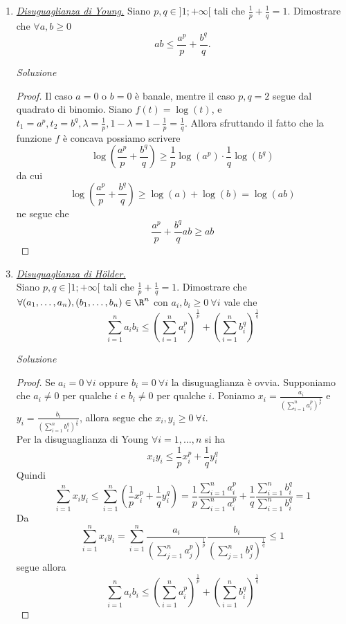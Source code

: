 \documentclass{article}
\begin{document}
\begin{enumerate}[label=\textbf{Esercizio 12.\arabic*.},itemindent=*]
\begin{proof}
    \[(x - y)\frac{f(y +\lambda(x - y))- f(y)}{\lambda(x - y)} \leq f(x) - f(y)\]
    Passando al limite per $\lambda\to 0^+$, dalla derivabilità di $f$ segue 
    \[(x - y)f'(y)\leq f(x) - f(y)\]
    ossia 
    \[f(x)\geq f(y) + f'(y)(x - y).\]
    Per l'arbitrarietà di $x,y\in \R$, la dimostrazione è conclusa.
\end{proof}
\item \underline{\textit{Disuguaglianza di Young.}} Siano $p, q\in ]1;+\infty[$ tali che $\frac{1}{p}+\frac{1}{q}=1$. Dimostrare che $\forall a,b\geq 0$ 
\[ab\leq \frac{a^p}{p}+\frac{b^q}{q}.\]
\item[\textit{\large Soluzione~}]~
\begin{proof}
    Il caso $a=0$ o $b=0$ è banale, mentre il caso $p,q=2$ segue dal quadrato di binomio. Siano $f(t)=\log(t)$, e $t_1=a^p, t_2=b^q, \lambda =\frac{1}{p}, 1-\lambda=1-\frac{1}{p}=\frac{1}{q}$.
    Allora sfruttando il fatto che la funzione $f$ è concava possiamo scrivere
    \[\log\left( \frac{a^p}{p}+\frac{b^q}{q} \right)\geq \frac{1}{p}\log(a^p)\cdot\frac{1}{q}\log(b^q)\]
    da cui
    \[\log\left( \frac{a^p}{p}+\frac{b^q}{q} \right)\geq \log(a)+\log(b)=\log(ab)\]
    ne segue che 
    \[\frac{a^p}{p}+\frac{b^q}{q}ab\geq ab\]
\end{proof}
\item \underline{\textit{Disuguaglianza di Hölder.}} \\Siano $p, q\in ]1;+\infty[$ tali che $\frac{1}{p}+\frac{1}{q}=1$. Dimostrare che $\forall (a_1, \dots, a_n), (b_1,\dots, b_n)\in \R^n$ con $a_i, b_i\geq 0~\forall i$ vale che 
\[\sum_{i=1}^n a_ib_i\leq \left(\sum_{i=1}^na_i^p\right)^{\frac{1}{p}}+\left(\sum_{i=1}^nb_i^q\right)^{\frac{1}{q}}\]
\item[\textit{\large Soluzione~}]~
\begin{proof}
   Se $a_i=0~\forall i$ oppure $b_i=0~\forall i$ la disuguaglianza è ovvia. Supponiamo che $a_i\neq 0$ per qualche $i$ e $b_i\neq 0$ per qualche $i$. Poniamo $x_i=\frac{a_i}{\left(\sum\limits_{i=1}^na_i^p\right)^{\frac{1}{p}}}$ e $y_i=\frac{b_i}{\left(\sum\limits_{i=1}^nb_i^q\right)^{\frac{1}{q}}}$, allora segue che $x_i,y_i\geq 0~\forall i$.
   \\Per la disuguaglianza di Young $\forall i=1, \dots, n$ si ha
   \[x_iy_i\leq \frac{1}{p}x_i^p+\frac{1}{q}y_i^q\]
   Quindi 
   \[\sum\limits_{i=1}^nx_iy_i\leq\sum\limits_{i=1}^n\left( \frac{1}{p}x_i^p+\frac{1}{q}y_i^q\right)=\frac{1}{p}\frac{\sum\limits_{i=1}^na_i^p}{\sum\limits_{i=1}^na_i^p}+\frac{1}{q}\frac{\sum\limits_{i=1}^nb_i^q}{\sum\limits_{i=1}^nb_i^q}=1\]
   Da
   \[\sum_{i = 1}^nx_iy_i =\sum_{i = 1}^n\frac{a_i}{(\sum_{j = 1}^n a_j^p)^{\frac{1}{p}}}\frac{b_i}{(\sum_{j = 1}^n b_j^q)^{\frac{1}{q}}}\leq 1\]
   segue allora
   \[\sum_{i=1}^n a_ib_i\leq \left(\sum_{i=1}^na_i^p\right)^{\frac{1}{p}}+\left(\sum_{i=1}^nb_i^q\right)^{\frac{1}{q}}\]
\end{proof}


\end{enumerate}
\end{document}
